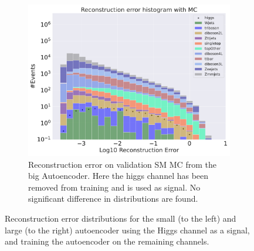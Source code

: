 \begin{figure}[h!]
\begin{subfigure}{.45\textwidth}
        \includegraphics[width=\textwidth]{Figures/AE_testing/big/b_data_recon_big_rm3_feats_sig_higgs.pdf}
        \caption{Reconstruction error on validation SM MC from the big Autoencoder. Here the higgs channel has been removed from training and 
        is used as signal. No significant difference in distributions are found. }
        \label{fig:ae_big_higgs}
    \end{subfigure}
    \hfill 
    \caption[Reconstruction error using Higgs channel as signal]{Reconstruction error distributions for the small (to the left) and large (to the right) autoencoder using the Higgs channel as a signal, and 
    training the autoencoder on the remaining channels.  } 
    \label{fig:ae_big_channel_1}
    
\end{figure}

